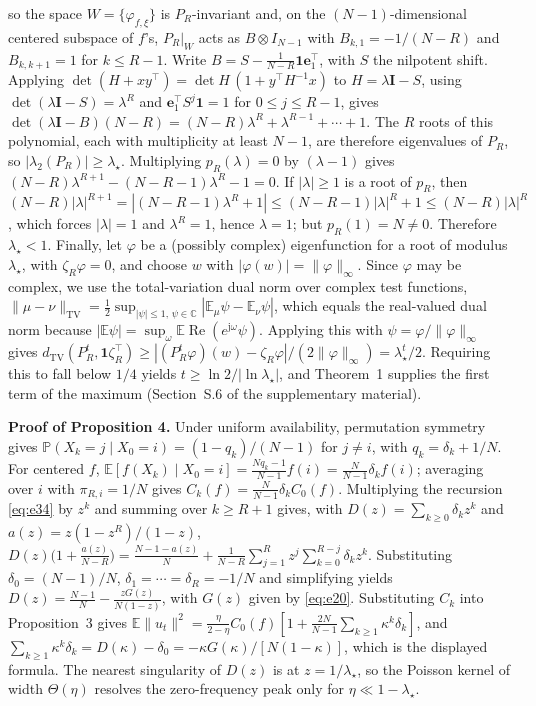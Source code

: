 \documentclass[twoside,11pt]{article}
\begin{document}
so the space $W=\{\varphi_{f,\xi}\}$ is $P_R$-invariant and, on the $(N-1)$-dimensional centered subspace of $f$'s, $P_R|_W$ acts as $B\otimes I_{N-1}$ with $B_{k,1}=-1/(N-R)$ and $B_{k,k+1}=1$ for $k\leq R-1$. Write $B=S-\frac{1}{N-R}\mathbf{1}\mathbf{e}_1^{\top}$, with $S$ the nilpotent shift. Applying $\det(H+xy^{\top})=\det H\,(1+y^{\top}H^{-1}x)$ to $H=\lambda\mathbf{I}-S$, using $\det(\lambda\mathbf{I}-S)=\lambda^{R}$ and $\mathbf{e}_1^{\top}S^{j}\mathbf{1}=1$ for $0\le j\le R-1$, gives $\det(\lambda\mathbf{I}-B)(N-R)=(N-R)\lambda^{R}+\lambda^{R-1}+\cdots+1$. The $R$ roots of this polynomial, each with multiplicity at least $N-1$, are therefore eigenvalues of $P_R$, so $|\lambda_2(P_R)|\geq\lambda_\star$. Multiplying $p_R(\lambda)=0$ by $(\lambda-1)$ gives $(N-R)\lambda^{R+1}-(N-R-1)\lambda^{R}-1=0$. If $|\lambda|\geq1$ is a root of $p_R$, then $(N-R)|\lambda|^{R+1}=|(N-R-1)\lambda^{R}+1|\leq(N-R-1)|\lambda|^{R}+1\leq(N-R)|\lambda|^{R}$, which forces $|\lambda|=1$ and $\lambda^{R}=1$, hence $\lambda=1$; but $p_R(1)=N\neq0$. Therefore $\lambda_\star<1$. Finally, let $\varphi$ be a (possibly complex) eigenfunction for a root of modulus $\lambda_\star$, with $\zeta_R\varphi=0$, and choose $w$ with $|\varphi(w)|=\|\varphi\|_\infty$. Since $\varphi$ may be complex, we use the total-variation dual norm over complex test functions, $\|\mu-\nu\|_{\mathrm{TV}}=\tfrac12\sup_{|\psi|\le1,\,\psi\in\mathbb{C}}|\mathbb{E}_\mu \psi-\mathbb{E}_\nu \psi|$, which equals the real-valued dual norm because $|\mathbb{E}\psi|=\sup_\omega\mathbb{E}\operatorname{Re}(e^{\mathrm{j}\omega}\psi)$. Applying this with $\psi=\varphi/\|\varphi\|_\infty$ gives $d_{\mathrm{TV}}(P_R^{t},\mathbf{1}\zeta_R^{\top})\geq|(P_R^{t}\varphi)(w)-\zeta_R\varphi|/(2\|\varphi\|_\infty)=\lambda_\star^{t}/2$. Requiring this to fall below $1/4$ yields $t\geq\ln2/|\ln\lambda_\star|$, and Theorem~1 supplies the first term of the maximum (Section~S.6 of the supplementary material).

\textbf{Proof of Proposition 4.} Under uniform availability, permutation symmetry gives $\mathbb{P}(X_k=j\mid X_0=i)=(1-q_k)/(N-1)$ for $j\neq i$, with $q_k=\delta_k+1/N$. For centered $f$, $\mathbb{E}[f(X_k)\mid X_0=i]=\frac{Nq_k-1}{N-1}f(i)=\frac{N}{N-1}\delta_k f(i)$; averaging over $i$ with $\pi_{R,i}=1/N$ gives $C_k(f)=\frac{N}{N-1}\delta_k C_0(f)$. Multiplying the recursion \eqref{eq:e34} by $z^{k}$ and summing over $k\geq R+1$ gives, with $D(z)=\sum_{k\geq0}\delta_k z^{k}$ and $a(z)=z(1-z^{R})/(1-z)$,
$D(z)\bigl(1+\frac{a(z)}{N-R}\bigr)=\frac{N-1-a(z)}{N}+\frac{1}{N-R}\sum_{j=1}^{R}z^{j}\sum_{k=0}^{R-j}\delta_k z^{k}$.
Substituting $\delta_0=(N-1)/N$, $\delta_1=\cdots=\delta_R=-1/N$ and simplifying yields $D(z)=\frac{N-1}{N}-\frac{zG(z)}{N(1-z)}$, with $G(z)$ given by \eqref{eq:e20}. Substituting $C_k$ into Proposition~3 gives $\mathbb{E}\|u_t\|^2=\frac{\eta}{2-\eta}C_0(f)[1+\frac{2N}{N-1}\sum_{k\geq1}\kappa^{k}\delta_k]$, and $\sum_{k\geq1}\kappa^{k}\delta_k=D(\kappa)-\delta_0=-\kappa G(\kappa)/[N(1-\kappa)]$, which is the displayed formula. The nearest singularity of $D(z)$ is at $z=1/\lambda_\star$, so the Poisson kernel of width $\Theta(\eta)$ resolves the zero-frequency peak only for $\eta\ll1-\lambda_\star$.
\end{document}

